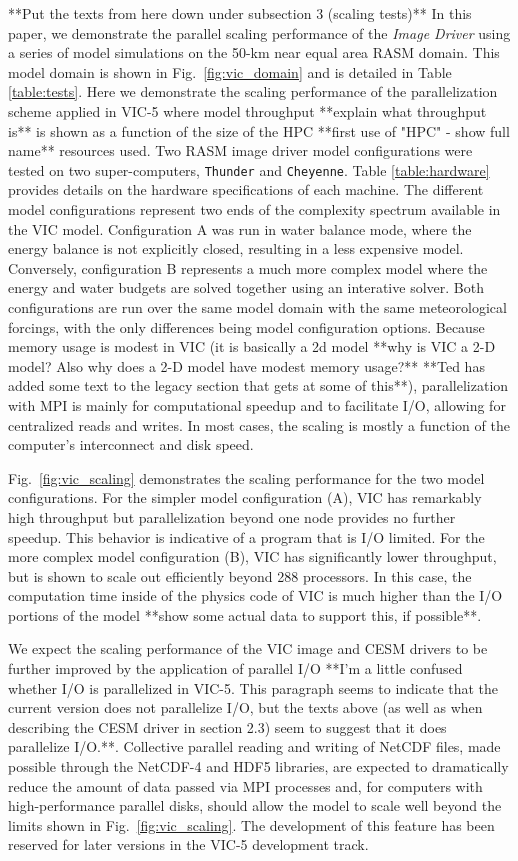 \documentclass[gmd, manuscript]{copernicus}
\begin{document}
	**Put the texts from here down under subsection 3 (scaling tests)**
    In this paper, we demonstrate the parallel scaling performance of the \textit{Image Driver} using a series of model simulations on the 50-km near equal area RASM domain. This model domain is shown in Fig.~\ref{fig:vic_domain} and is detailed in Table \ref{table:tests}. Here we demonstrate the scaling performance of the parallelization scheme applied in VIC-5 where model throughput **explain what throughput is** is shown as a function of the size of the HPC **first use of "HPC" - show full name** resources used. Two RASM image driver model configurations were tested on two super-computers, \verb|Thunder| and \verb|Cheyenne|. Table \ref{table:hardware} provides details on the hardware specifications of each machine. The different model configurations represent two ends of the complexity spectrum available in the VIC model. Configuration A was run in water balance mode, where the energy balance is not explicitly closed, resulting in a less expensive model. Conversely, configuration B represents a much more complex model where the energy and water budgets are solved together using an interative solver. Both configurations are run over the same model domain with the same meteorological forcings, with the only differences being model configuration options. Because memory usage is modest in VIC (it is basically a 2d model **why is VIC a 2-D model? Also why does a 2-D model have modest memory usage?** **Ted has added some text to the legacy section that gets at some of this**), parallelization with MPI is mainly for computational speedup and to facilitate I/O, allowing for centralized reads and writes. In most cases, the scaling  is mostly a function of the computer's interconnect and disk speed.

    Fig.~\ref{fig:vic_scaling} demonstrates the scaling performance for the two model configurations. For the simpler model configuration (A), VIC has remarkably high throughput but parallelization beyond one node provides no further speedup. This behavior is indicative of a program that is I/O limited. For the more complex model configuration (B), VIC has significantly lower throughput, but is shown to scale out efficiently beyond 288 processors. In this case, the computation time inside of the physics code of VIC is much higher than the I/O portions of the model **show some actual data to support this, if possible**.

    We expect the scaling performance of the VIC image and CESM drivers to be further improved by the application of parallel I/O **I'm a little confused whether I/O is parallelized in VIC-5. This paragraph seems to indicate that the current version does not parallelize I/O, but the texts above (as well as when describing the CESM driver in section 2.3) seem to suggest that it does parallelize I/O.**. Collective parallel reading and writing of NetCDF files, made possible through the NetCDF-4 and HDF5 libraries, are expected to dramatically reduce the amount of data passed via MPI processes and, for computers with high-performance parallel disks, should allow the model to scale well beyond the limits shown in Fig.~\ref{fig:vic_scaling}. The development of this feature has been reserved for later versions in the VIC-5 development track.
\end{document}
